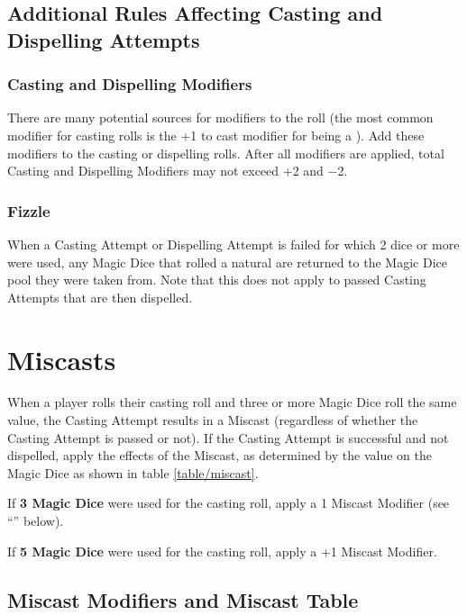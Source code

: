\subsection{Additional Rules Affecting Casting and Dispelling Attempts}

\subsubsection{Casting and Dispelling Modifiers}
\label{casting_and_dispelling_modifiers}

There are many potential sources for modifiers to the roll (the most common modifier for casting rolls is the +1 to cast modifier for being a \wizardmaster{}). Add these modifiers to the casting or dispelling rolls. After all modifiers are applied, total Casting and Dispelling Modifiers may not exceed +2 and −2.

\subsubsection{Fizzle}
\label{fizzle}

When a Casting Attempt or Dispelling Attempt is failed for which 2 dice or more were used, any Magic Dice that rolled a natural  are returned to the Magic Dice pool they were taken from. Note that this does not apply to passed Casting Attempts that are then dispelled.

\section{Miscasts}
\label{miscast}

When a player rolls their casting roll and three or more Magic Dice roll the same value, the Casting Attempt results in a Miscast (regardless of whether the Casting Attempt is passed or not). If the Casting Attempt is successful and not dispelled, apply the effects of the Miscast, as determined by the value on the Magic Dice as shown in table \ref{table/miscast}.

If \textbf{3 Magic Dice} were used for the casting roll, apply a \minuss{}1 Miscast Modifier (see \enquote{} below).

If \textbf{5 Magic Dice} were used for the casting roll, apply a +1 Miscast Modifier.

\subsection{Miscast Modifiers and Miscast Table}
\label{miscast_modifiers}

